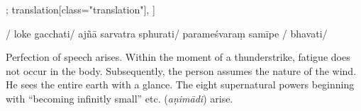 \begin{alignment}[
  texts=edition[class="edition"];
  translation[class="translation"],
  ]
\begin{edition}
\begin{prose}[p42_03]
{  }/
loke gacchati/
ajñā sarvatra sphurati/
parameśvaraṃ samīpe
/
bhavati/
\end{prose}
  \end{edition}
  \begin{translation}
    \begin{tlate}[p42_02]
      \noindent
      Perfection of speech arises. Within the moment of a thunderstrike, fatigue does not occur in the body. Subsequently, the person assumes the nature of the wind. He sees the entire earth with a glance. The eight supernatural powers beginning with ``becoming infinitly small'' etc. (\textit{aṇimādi}) arise.
    \end{tlate}
    \begin{tlate}[42_1]

\end{tlate}
\end{translation}
\end{alignment}
